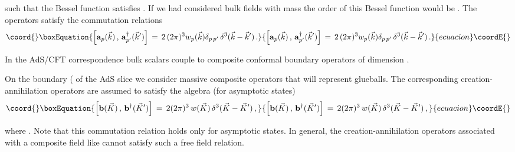 \documentclass[a4paper,twocolumn,prd,groupedaddress,nofootinbib]{revtex4}
\begin{document}
\noindent 
such that the Bessel function satisfies \coordHE{}. 
If we had considered bulk fields with mass \coordHE{} the order of this Bessel 
function would be \coordHE{}. The operators 
\coordHE{} satisfy the commutation relations
\begin{equation}\coord{}\boxEquation{
\label{canonical1}
\Big[ {\bf a}_p(\vec k )\,,\,{\bf a}^\dagger_{p^\prime}({\vec k}^\prime  )
\Big]\,=\, 2\, (2\pi)^{3} w_p(\vec k )   
\delta_{p\,  p^\prime}\,\delta^{3} (\vec k -
{\vec k}^\prime )\,.
}{
\Big[ {\bf a}_p(\vec k )\,,\,{\bf a}^\dagger_{p^\prime}({\vec k}^\prime  )
\Big]\,=\, 2\, (2\pi)^{3} w_p(\vec k )   
\delta_{p\,  p^\prime}\,\delta^{3} (\vec k -
{\vec k}^\prime )\,.
}{ecuacion}\coordE{}\end{equation}
 
\noindent In the AdS/CFT correspondence bulk scalars couple to 
composite conformal boundary operators of dimension 
\coordHE{}.

On the boundary (\coordHE{} of the AdS slice we consider massive 
composite operators \coordHE{} that will represent 
glueballs. 
The corresponding creation-annihilation operators are assumed to 
satisfy the algebra (for asymptotic states) 
\begin{equation}\coord{}\boxEquation{
\label{canonical2}
\Big[ {\bf b}( \vec K )\,,\,{\bf b}^\dagger ({ \vec K }^\prime  )
\Big]\,=\, 2 (2\pi)^{3} \, w( \vec K ) \,\delta^3 ( \vec K -
{ \vec K}^\prime ) \,,
}{
\Big[ {\bf b}( \vec K )\,,\,{\bf b}^\dagger ({ \vec K }^\prime  )
\Big]\,=\, 2 (2\pi)^{3} \, w( \vec K ) \,\delta^3 ( \vec K -
{ \vec K}^\prime ) \,,
}{ecuacion}\coordE{}\end{equation}

\noindent where \coordHE{}. 
Note that this commutation relation holds only for
asymptotic states. In general, 
the creation-annihilation operators associated with a
composite field like \coordHE{} cannot satisfy 
such a free field relation.
\end{document}
